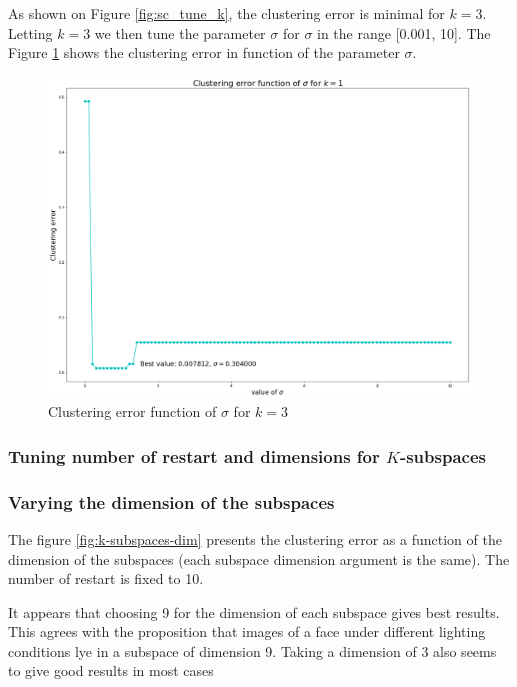 \documentclass[a4paper, 11pt]{article}
\begin{document}
As shown on Figure \ref{fig:sc_tune_k}, the clustering error is minimal for $k = 3$. Letting $k=3$ we then tune the parameter $\sigma$ for $\sigma$ in the range [0.001, 10]. The Figure \ref{fig:sc_tune_sig} shows the clustering error in function of the parameter $\sigma$.

\begin{figure}[H]
	\centering
	\includegraphics[width=.7\linewidth]{imgs/SC_tune_sigma.png}
	\caption{Clustering error function of $\sigma$ for $k=3$}
	\label{fig:sc_tune_sig}
\end{figure}

\subsubsection{Tuning number of restart and dimensions for $K$-subspaces}

\subsubsection{Varying the dimension of the subspaces}

The figure \ref{fig:k-subspaces-dim} presents the clustering error as a function of the dimension of the subspaces (each subspace dimension argument is the same). The number of restart is fixed to 10.

It appears that choosing 9 for the dimension of each subspace gives best results. This agrees with the proposition that images of a face under different lighting conditions lye in a subspace of dimension 9. Taking a dimension
of 3 also seems to give good results in most cases
\end{document}
